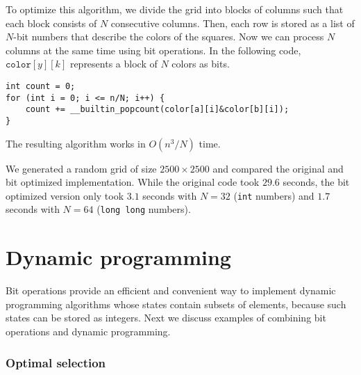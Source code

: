 To optimize this algorithm, we divide the grid into blocks
of columns such that each block consists of $N$
consecutive columns. Then, each row is stored as
a list of $N$-bit numbers that describe the colors
of the squares. Now we can process $N$ columns at the same time
using bit operations. In the following code,
$\texttt{color}[y][k]$ represents
a block of $N$ colors as bits.
\begin{lstlisting}
int count = 0;
for (int i = 0; i <= n/N; i++) {
    count += __builtin_popcount(color[a][i]&color[b][i]);
}
\end{lstlisting}
The resulting algorithm works in $O(n^3/N)$ time.

We generated a random grid of size $2500 \times 2500$
and compared the original and bit optimized implementation.
While the original code took $29.6$ seconds,
the bit optimized version only took $3.1$ seconds
with $N=32$ (\texttt{int} numbers) and $1.7$ seconds
with $N=64$ (\texttt{long long} numbers).

\section{Dynamic programming}

Bit operations provide an efficient and convenient
way to implement dynamic programming algorithms
whose states contain subsets of elements,
because such states can be stored as integers.
Next we discuss examples of combining
bit operations and dynamic programming.

\subsubsection{Optimal selection}

